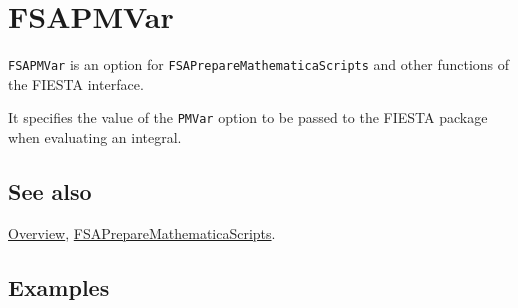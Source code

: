 \documentclass[../FeynHelpersManual.tex]{subfiles}
\begin{document}
\hypertarget{fsapmvar}{
\section{FSAPMVar}\label{fsapmvar}}

\texttt{FSAPMVar} is an option for \texttt{FSAPrepareMathematicaScripts}
and other functions of the FIESTA interface.

It specifies the value of the \texttt{PMVar} option to be passed to the
FIESTA package when evaluating an integral.

\subsection{See also}

\hyperlink{toc}{Overview},
\hyperlink{fsapreparemathematicascripts}{FSAPrepareMathematicaScripts}.

\subsection{Examples}
\end{document}

